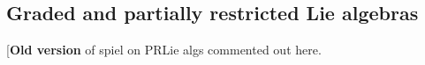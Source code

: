 \documentclass[11pt]{amsart}
\theoremstyle{plain}
\theoremstyle{definition}
\DeclareMathOperator{\im}{im}
\newcommand{\DASH}{\textup{--}}
\renewcommand{\to}{\longrightarrow}
\newcommand{\scrL}{\mathscr{L}}
\newcommand{\calV}{\mathcal{V}}
\theoremstyle{plain}
\newcommand{\LieOperad}{{\scrL}}
\newcommand{\restn}[1]{{#1}^{[2]}}
\newcommand{\vect}[2]{\calV^{#1}_{#2}}
\begin{document}
\begin{Lie algebras in characteristic 2 and their homotopy operations}
\subsection{Graded and partially restricted Lie algebras}
[\textbf{Old version} of spiel on PRLie algs commented out here.%
%
%

\end{Lie algebras in characteristic 2 and their homotopy operations}
\end{document}
